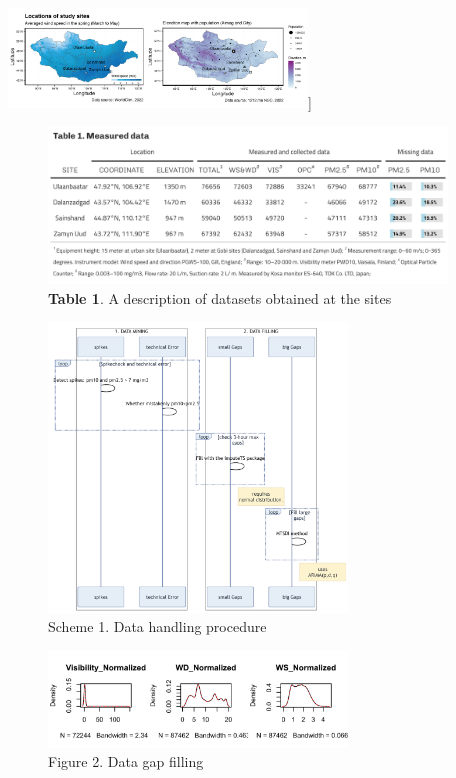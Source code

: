 \documentclass[
  11pt,
]{article}
\begin{document}
\newpage

\includegraphics[width=3.125in,height=\textheight,keepaspectratio]{images/figure_1.png}{]}

\begin{figure}
\centering
\includegraphics[width=4.16667in,height=\textheight,keepaspectratio]{images/table_1.png}
\caption{\textbf{Table 1}. A description of datasets obtained at the
sites}
\end{figure}

\newpage

\begin{figure}
\centering
\includegraphics[width=3.125in,height=\textheight,keepaspectratio]{images/scheme_1.png}
\caption{Scheme 1. Data handling procedure}
\end{figure}

\newpage

\begin{figure}
\centering
\includegraphics[width=3.125in,height=\textheight,keepaspectratio]{images/figure_2b.png}
\caption{Figure 2. Data gap filling}
\end{figure}
\end{document}
